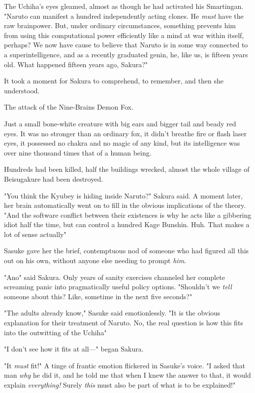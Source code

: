 The Uchiha's eyes gleamed, almost as though he had activated his Smartingan.
"Naruto can manifest a hundred independently acting clones. He \emph{must} have
the raw brainpower. But, under ordinary circumstances, something prevents him
from using this computational power efficiently{\el} like a mind at war
within itself, perhaps? We now have cause to believe that Naruto is in some way
connected to a superintelligence, and as a recently graduated genin, he, like
us, is fifteen years old. What happened fifteen years ago, Sakura?"

It took a moment for Sakura to comprehend, to remember, and then she understood.

The attack of the Nine-Brains Demon Fox.

Just a small bone-white creature with big ears and bigger tail and beady red
eyes. It was no stronger than an ordinary fox, it didn't breathe fire or flash
laser eyes, it possessed no chakra and no magic of any kind, but its
intelligence was over nine thousand times that of a human being.

Hundreds had been killed, half the buildings wrecked, almost the whole village
of Beisugakure had been destroyed.

"You think the Kyubey is hiding inside Naruto?" Sakura said. A moment later,
her brain automatically went on to fill in the obvious implications of the
theory. "And the software conflict between their existences is why he acts like
a gibbering idiot half the time, but can control a hundred Kage Bunshin. Huh.
That makes{\el} a lot of sense{\el} actually{\el}"

Sasuke gave her the brief, contemptuous nod of someone who had figured all this
out on his own, without anyone else needing to prompt \emph{him}.

"Ano{\el}" said Sakura. Only years of sanity exercises channeled her
complete screaming panic into pragmatically useful policy options. "Shouldn't
we{\el} \emph{tell} someone about this? Like, sometime in the next five
seconds?"

"The adults already know," Sasuke said emotionlessly. "It is the obvious
explanation for their treatment of Naruto. No, the real question is how this
fits into the outwitting of the Uchiha{\el}"

"I don't see how it fits at all—" began Sakura.

"It \emph{must} fit!" A tinge of frantic emotion flickered in Sasuke's voice.
"I asked that man \emph{why} he did it, and he told me that when I knew the
answer to that, it would explain \emph{everything!} Surely \emph{this} must
also be part of what is to be explained!"

